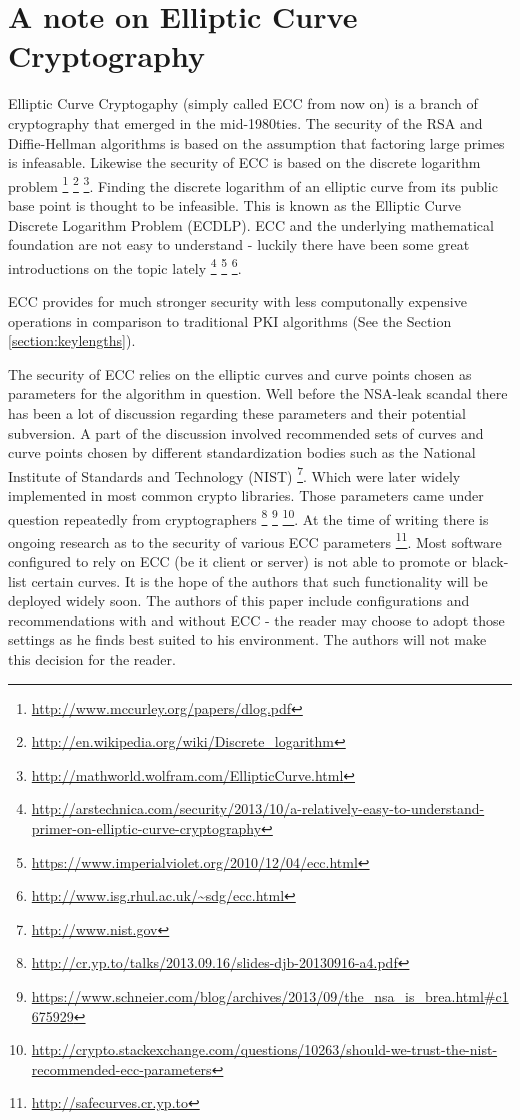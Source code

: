 \section{A note on Elliptic Curve Cryptography}
\label{section:EllipticCurveCryptography}

Elliptic Curve Cryptogaphy (simply called ECC from now on) is a branch of 
cryptography that emerged in the mid-1980ties. The security of the RSA and 
Diffie-Hellman algorithms is based on the assumption that factoring large 
primes is infeasable. Likewise the security of ECC is based on the discrete 
logarithm problem
\footnote{\url{http://www.mccurley.org/papers/dlog.pdf}} 
\footnote{\url{http://en.wikipedia.org/wiki/Discrete\_logarithm}}
\footnote{\url{http://mathworld.wolfram.com/EllipticCurve.html}}.
Finding the discrete logarithm of an elliptic curve from its public base
point is thought to be infeasible. This is known as the Elliptic Curve Discrete 
Logarithm Problem (ECDLP). ECC and the underlying mathematical foundation are not easy 
to understand - luckily there have been some great introductions on the topic lately
\footnote{\url{http://arstechnica.com/security/2013/10/a-relatively-easy-to-understand-primer-on-elliptic-curve-cryptography}}
\footnote{\url{https://www.imperialviolet.org/2010/12/04/ecc.html}}
\footnote{\url{http://www.isg.rhul.ac.uk/~sdg/ecc.html}}.

ECC provides for much stronger security with less computonally expensive
operations in comparison to traditional PKI algorithms (See the Section \ref{section:keylengths}).


The security of ECC relies on the elliptic curves and curve points chosen
as parameters for the algorithm in question. Well before the NSA-leak scandal
there has been a lot of discussion regarding these parameters and their 
potential subversion. A part of the discussion involved recommended sets 
of curves and curve points chosen by different standardization bodies such 
as the National Institute of Standards and Technology (NIST) 
\footnote{\url{http://www.nist.gov}}. Which were later widely implemented 
in most common crypto libraries. Those parameters came under question 
repeatedly from cryptographers
\footnote{\url{http://cr.yp.to/talks/2013.09.16/slides-djb-20130916-a4.pdf}}
\footnote{\url{https://www.schneier.com/blog/archives/2013/09/the\_nsa\_is\_brea.html\#c1675929}}
\footnote{\url{http://crypto.stackexchange.com/questions/10263/should-we-trust-the-nist-recommended-ecc-parameters}}.
At the time of writing there is ongoing research as to the security of 
various ECC parameters
\footnote{\url{http://safecurves.cr.yp.to}}. 
Most software configured to rely on ECC (be it client or server) is
not able to promote or black-list certain curves. It is the hope of
the authors that such functionality will be deployed widely soon.
The authors of this paper include configurations and recommendations
with and without ECC - the reader may choose to adopt those settings
as he finds best suited to his environment. The authors will not make
this decision for the reader.


